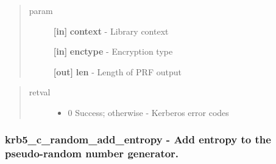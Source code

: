\documentclass[letterpaper,10pt,english]{sphinxmanual}
\begin{document}
\begin{quote}\begin{description}
\item[{param}] \leavevmode
\textbf{{[}in{]}} \textbf{context} - Library context

\textbf{{[}in{]}} \textbf{enctype} - Encryption type

\textbf{{[}out{]}} \textbf{len} - Length of PRF output

\end{description}\end{quote}
\begin{quote}\begin{description}
\item[{retval}] \leavevmode\begin{itemize}
\item {} 
0   Success; otherwise - Kerberos error codes

\end{itemize}

\end{description}\end{quote}


\subsubsection{krb5\_c\_random\_add\_entropy -  Add entropy to the pseudo-random number generator.}
\label{appdev/refs/api/krb5_c_random_add_entropy::doc}\label{appdev/refs/api/krb5_c_random_add_entropy:krb5-c-random-add-entropy-add-entropy-to-the-pseudo-random-number-generator}

\begin{fulllineitems}
\label{appdev/refs/api/krb5_c_random_add_entropy:krb5_c_random_add_entropy}
\end{fulllineitems}
\end{document}
